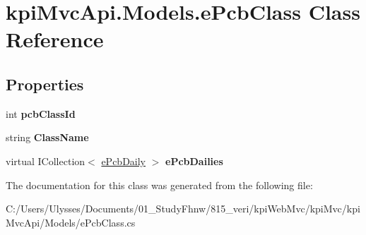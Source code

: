 \hypertarget{classkpi_mvc_api_1_1_models_1_1e_pcb_class}{}\section{kpi\+Mvc\+Api.\+Models.\+e\+Pcb\+Class Class Reference}
\label{classkpi_mvc_api_1_1_models_1_1e_pcb_class}
\subsection*{Properties}
\begin{DoxyCompactItemize}
\item 
\mbox{\label{classkpi_mvc_api_1_1_models_1_1e_pcb_class_a965a87f4cf04977854b30871dcc0d93a}} 
int {\bfseries pcb\+Class\+Id}
\item 
\mbox{\label{classkpi_mvc_api_1_1_models_1_1e_pcb_class_a185a3ce955b1b1ade5b3c56bf78ad9a0}} 
string {\bfseries Class\+Name}
\item 
\mbox{\label{classkpi_mvc_api_1_1_models_1_1e_pcb_class_adfbc3ce0ed5c795dbfc7969025d2005b}} 
virtual I\+Collection$<$ \hyperlink{classkpi_mvc_api_1_1_models_1_1e_pcb_daily}{e\+Pcb\+Daily} $>$ {\bfseries e\+Pcb\+Dailies}
\end{DoxyCompactItemize}


The documentation for this class was generated from the following file\+:\begin{DoxyCompactItemize}
\item 
C\+:/\+Users/\+Ulysses/\+Documents/01\+\_\+\+Study\+Fhnw/815\+\_\+veri/kpi\+Web\+Mvc/kpi\+Mvc/kpi\+Mvc\+Api/\+Models/e\+Pcb\+Class.\+cs\end{DoxyCompactItemize}
